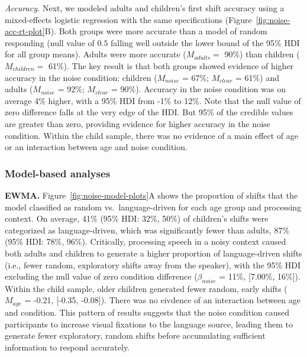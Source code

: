 \documentclass[english,floatsintext,man]{apa6}
\begin{document}
\emph{Accuracy.} Next, we modeled adults and children's first shift
accuracy using a mixed-effects logistic regression with the same
specifications (Figure~\ref{fig:noise-acc-rt-plot}B). Both groups were
more accurate than a model of random responding (null value of \(0.5\)
falling well outside the lower bound of the 95\% HDI for all group
means). Adults were more accurate (\(M_{adults} =\) 90\%) than children
(\(M_{children} =\) 61\%). The key result is that both groups showed
evidence of higher accuracy in the noise condition: children
(\(M_{noise}\) = 67\%; \(M_{clear}\) = 61\%) and adults (\(M_{noise}\) =
92\%; \(M_{clear}\) = 90\%). Accuracy in the noise condition was on
average 4\% higher, with a 95\% HDI from -1\% to 12\%. Note that the
null value of zero difference falls at the very edge of the HDI. But
95\% of the credible values are greater than zero, providing evidence
for higher accuracy in the noise condition. Within the child sample,
there was no evidence of a main effect of age or an interaction between
age and noise condition.

\hypertarget{model-based-analyses-2}{%
\subsubsection{Model-based analyses}\label{model-based-analyses-2}}

\textbf{EWMA.} Figure~\ref{fig:noise-model-plots}A shows the proportion
of shifts that the model classified as random vs.~language-driven for
each age group and processing context. On average, 41\% (95\% HDI: 32\%,
50\%) of children's shifts were categorized as language-driven, which
was significantly fewer than adults, 87\% (95\% HDI: 78\%, 96\%).
Critically, processing speech in a noisy context caused both adults and
children to generate a higher proportion of language-driven shifts
(i.e., fewer random, exploratory shifts away from the speaker), with the
95\% HDI excluding the null value of zero condition difference
(\(\beta_{noise}\) = 11\%, {[}7.00\%, 16\%{]}). Within the child sample,
older children generated fewer random, early shifts (\(M_{age}\) =
-0.21, {[}-0.35, -0.08{]}). There was no eivdence of an interaction
between age and condition. This pattern of results suggests that the
noise condition caused participants to increase visual fixations to the
language source, leading them to generate fewer exploratory, random
shifts before accumulating sufficient information to respond accurately.
\end{document}
